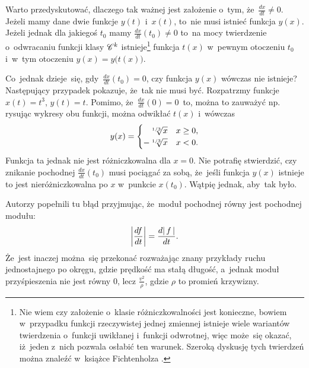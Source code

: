 \documentclass[a4paper,11pt]{article}
\begin{document}
\start {} Warto przedyskutować, dlaczego tak ważnej jest
założenie o~tym, że~$\frac{ dx }{ dt } \neq 0$. Jeżeli mamy dane dwie
funkcje $y( t )$ i~$x( t )$, to~nie musi istnieć funkcja $y( x )$.
Jeżeli jednak dla jakiegoś $t_{ 0 }$ mamy
$\frac{ dx }{ dt }( t_{ 0 } ) \neq 0$ to~na mocy twierdzenie
o~odwracaniu funkcji klasy $\mathcal{C}^{ k }$ istnieje\footnote{Nie wiem czy
  założenie o~klasie różniczkowalności jest konieczne, bowiem
  w~przypadku funkcji rzeczywistej jednej zmiennej istnieje wiele
  wariantów twierdzenia o~funkcji uwikłanej i~funkcji odwrotnej, więc
  może~się okazać, iż~jeden z~nich pozwala osłabić ten warunek.
  Szeroką dyskusję tych twierdzeń można znaleźć w~książce Fichtenholza
  \cite{FichtenholzRachunekRozniczkowyETCVolI2005}.} funkcja $t( x )$ w~pewnym
otoczeniu $t_{ 0 }$ i~w~tym otoczeniu $y( x ) = y\big( t( x ) \big)$.

Co~jednak dzieje~się, gdy~$\frac{ dx }{ dt }( t_{ 0 } ) = 0$, czy
funkcja $y( x )$ wówczas nie istnieje? Następujący przypadek pokazuje,
że~tak nie musi być. Rozpatrzmy funkcje $x( t ) = t^{ 3 }$,
$y( t ) = t$. Pomimo, że~$\frac{ dx }{ dt }( 0 ) = 0$~to, można to
zauważyć np. rysując wykresy obu funkcji, można odwikłać $t( x )$
i~wówczas
\begin{equation}
  \label{eq:KrysickiWlodarskiAnalizaVolI-01}
  y( x ) =
  \begin{cases}
    \hphantom{-}\sqrt[ 1 / 3 ]{ x } & x \geq 0, \\
    -\sqrt[ 1 / 3 ]{ x } & x < 0.
  \end{cases}
\end{equation}
Funkcja ta jednak nie jest różniczkowalna dla $x = 0$. Nie potrafię
stwierdzić, czy znikanie pochodnej $\frac{ dx }{ dt }( t_{ 0 } )$ musi
pociągać za sobą, że~jeśli funkcja $y( x )$ istnieje to jest
nieróżniczkowalna po $x$ w~punkcie $x( t_{ 0 } )$. Wątpię jednak,
aby~tak było.

\vspace{\spaceFour}



\start {} Autorzy popełnili tu błąd przyjmując, że~moduł
pochodnej równy jest pochodnej modułu:
\begin{equation*}
  \label{eq:KrysickiWlodarskiAnalizaVolI-02}
  \left| \frac{ df }{ dt } \right| =
  \frac{ d |\, {  f  } \,| }{ dt }.
\end{equation*}
Że~jest inaczej można~się przekonać rozważając znany przykłady ruchu
jednostajnego po okręgu, gdzie prędkość ma stałą długość, a~jednak
moduł przyśpieszenia nie jest równy 0, lecz $\frac{ v^{ 2 } }{ \rho }$,
gdzie $\rho$ to promień krzywizny.
\end{document}
